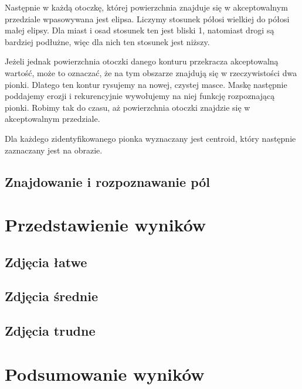 \documentclass[a4paper]{article}
\begin{document}
    Następnie w każdą otoczkę, której powierzchnia znajduje się w akceptowalnym przedziale wpasowywana jest elipsa.
    Liczymy stosunek półosi wielkiej do półosi małej elipsy. Dla miast i osad stosunek ten jest bliski 1, natomiast drogi są bardziej podłużne, więc dla nich ten stosunek jest niższy.

    Jeżeli jednak powierzchnia otoczki danego konturu przekracza akceptowalną wartość, może to oznaczać, że na tym obszarze znajdują się w rzeczywistości dwa pionki. Dlatego ten kontur rysujemy na nowej, czystej masce. Maskę następnie poddajemy erozji i rekurencyjnie wywołujemy na niej funkcję rozpoznającą pionki. Robimy tak do czasu, aż powierzchnia otoczki znajdzie się w akceptowalnym przedziale.

    Dla każdego zidentyfikowanego pionka wyznaczany jest centroid, który następnie zaznaczany jest na obrazie.
    
    \subsection{Znajdowanie i rozpoznawanie pól}
      
\section{Przedstawienie wyników}
    \subsection{Zdjęcia łatwe}
    \subsection{Zdjęcia średnie}
    \subsection{Zdjęcia trudne}
\section{Podsumowanie wyników}
\end{document}
